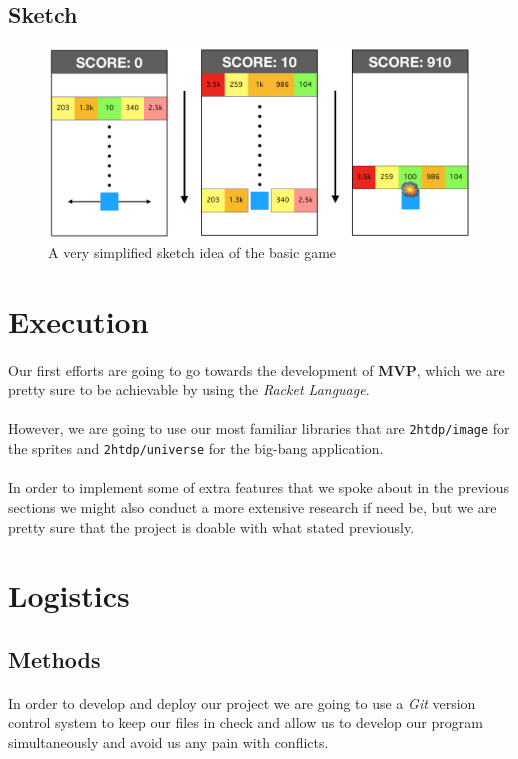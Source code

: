 \documentclass[a4paper]{article}
\begin{document}
\subsection{Sketch}
\begin{figure}[h]
  \includegraphics[width=\textwidth]{sketch.png}
  \caption{A very simplified sketch idea of the basic game}
\end{figure}

\section{Execution}
\paragraph{} Our first efforts are going to go towards the development of \textbf{MVP}, which we are pretty sure to be achievable by using the \emph{Racket Language}. \\ \\
However, we are going to use our most familiar libraries that are \texttt{2htdp/image} for the sprites and \texttt{2htdp/universe} for the big-bang application. \\ \\ In order to implement some of extra features that we spoke about in the previous sections we might also conduct a more extensive research if need be, but we are pretty sure that the project is doable with what stated previously.

\section{Logistics}
\subsection{Methods}
  \paragraph{} In order to develop and deploy our project we are going to use a \emph{Git} version control system to keep our files in check and allow us to develop our program simultaneously and avoid us any pain with conflicts.
\end{document}
